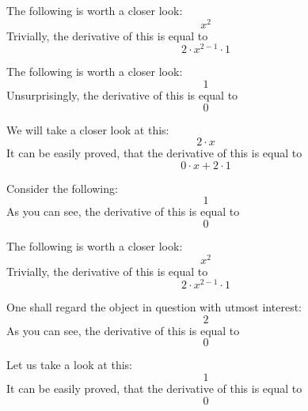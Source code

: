 \documentclass{article}
\begin{document}
The following is worth a closer look:
\begin{equation}
x ^{2 } 
\end{equation}
Trivially, the derivative of this is equal to
\begin{equation}
2 \cdot x ^{2 - 1 } \cdot 1 
\end{equation}

The following is worth a closer look:
\begin{equation}
1 
\end{equation}
Unsurprisingly, the derivative of this is equal to
\begin{equation}
0 
\end{equation}

We will take a closer look at this:
\begin{equation}
2 \cdot x 
\end{equation}
It can be easily proved, that the derivative of this is equal to
\begin{equation}
0 \cdot x + 2 \cdot 1 
\end{equation}

Consider the following:
\begin{equation}
1 
\end{equation}
As you can see, the derivative of this is equal to
\begin{equation}
0 
\end{equation}

The following is worth a closer look:
\begin{equation}
x ^{2 } 
\end{equation}
Trivially, the derivative of this is equal to
\begin{equation}
2 \cdot x ^{2 - 1 } \cdot 1 
\end{equation}

One shall regard the object in question with utmost interest:
\begin{equation}
2 
\end{equation}
As you can see, the derivative of this is equal to
\begin{equation}
0 
\end{equation}

Let us take a look at this:
\begin{equation}
1 
\end{equation}
It can be easily proved, that the derivative of this is equal to
\begin{equation}
0 
\end{equation}
\end{document}
